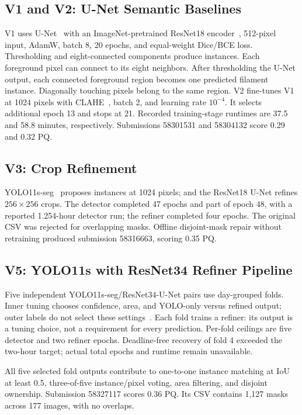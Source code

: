 \documentclass[sigconf]{acmart}
\begin{document}
\subsection{V1 and V2: U-Net Semantic Baselines}
V1 uses U-Net~\cite{unet} with an ImageNet-pretrained ResNet18
encoder~\cite{resnet}, 512-pixel input, AdamW, batch 8, 20 epochs,
and equal-weight Dice/BCE loss. Thresholding and eight-connected components
produce instances. Each foreground pixel can connect to its eight neighbors. 
After thresholding the U-Net output, each connected foreground region becomes 
one predicted filament instance. Diagonally touching pixels belong to the same region.
V2 fine-tunes V1 at 1024 pixels with
CLAHE~\cite{opencvclahevisual}, batch 2, and learning rate $10^{-4}$.
It selects additional epoch 13 and stops at 21. Recorded training-stage
runtimes are 37.5 and 58.8 minutes, respectively. Submissions 58301531
and 58304132 score 0.29 and 0.32 PQ.

\subsection{V3: Crop Refinement}
YOLO11s-seg~\cite{ultralyticsvisual} proposes instances at 1024 pixels;
and the ResNet18 U-Net refines $256\times256$ crops. The detector completed
47 epochs and part of epoch 48, with a reported 1.254-hour detector run;
the refiner completed four epochs. The original CSV was rejected for
overlapping masks. Offline disjoint-mask repair without retraining produced
submission 58316663, scoring 0.35 PQ.

\subsection{V5: YOLO11s with ResNet34 Refiner Pipeline}
Five independent YOLO11s-seg/ResNet34-U-Net pairs use day-grouped folds.
Inner tuning chooses confidence, area, and YOLO-only versus refined output;
outer labels do not select these settings~\cite{varma2006}.
Each fold trains a refiner: its output is a tuning choice, not a requirement
for every prediction. Per-fold ceilings are five detector and two refiner
epochs. Deadline-free recovery of fold 4 exceeded the two-hour target;
actual total epochs and runtime remain unavailable.

All five selected fold outputs contribute to one-to-one instance matching
at IoU at least 0.5, three-of-five instance/pixel voting, area filtering,
and disjoint ownership. Submission 58327117 scores 0.36 PQ.
Its CSV contains 1,127 masks across 177 images, with no overlaps.
\end{document}
